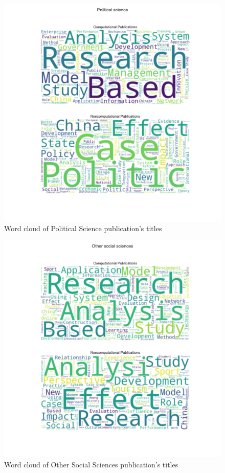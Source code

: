 \documentclass[12pt, a4paper]{article}
\begin{document}
\begin{figure}[H]
	\centering
	\includegraphics[width=\textwidth]{wc_Political_Science}
	\caption{Word cloud of Political Science publication's titles}
\end{figure}
\begin{figure}[H]
	\centering
	\includegraphics[width=\textwidth]{wc_Other_Social_Sciences}
	\caption{Word cloud of Other Social Sciences publication's titles}
\end{figure}
\end{document}
